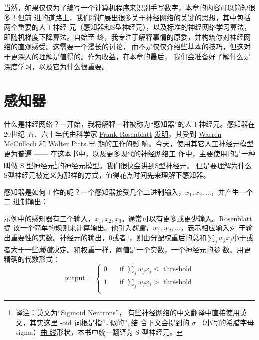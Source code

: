当然，如果仅仅为了编写一个计算机程序来识别手写数字，本章的内容可以简短很多！但前
进的道路上，我们将扩展出很多关于神经网络的关键的思想，其中包括两个重要的人工神经
元（感知器和S型神经元），以及标准的神经网络学习算法，即随机梯度下降算法。自始至
终，我专注于解释事情的原委，并构筑你对神经网络的直观感受。这需要一个漫长的讨论，
而不是仅仅介绍些基本的技巧，但这对于更深入的理解是值得的。作为收益，在本章的最后，
我们会准备好了解什么是深度学习，以及它为什么很重要。

\section{感知器}
\label{sec:Perceptrons}

什么是神经网络？一开始，我将解释一种被称为``感知器''的人工神经元。感知器在20世纪
五、六十年代由科学家 \href{http://en.wikipedia.org/wiki/Frank_Rosenblatt}{Frank
  Rosenblatt}
\href{http://books.google.ca/books/about/Principles_of_neurodynamics.html?id=7FhRAAAAMAAJ}{
  发明}，其受到 \href{http://en.wikipedia.org/wiki/Warren_McCulloch}{Warren
  McCulloch} 和 \href{http://en.wikipedia.org/wiki/Walter_Pitts}{Walter Pitts} 早
期的\href{http://scholar.google.ca/scholar?cluster=4035975255085082870}{工作}的影
响。今天，使用其它人工神经元模型更为普遍 —— 在这本书中，以及更多现代的神经网络工
作中，主要使用的是一种叫做 S 型神经元\footnote{译注：英文为``Sigmoid Neutrons''，
  有些神经网络的中文翻译中直接使用英文，其实这里 -oid 词根是指``\ldots 似的'', 结
  合下文会提到的 $\sigma$ （小写的希腊字母 sigma）\hyperref[fig:sigmoid_graph]{曲
    线}形状，本书中统一翻译为 S 型神经元。}的神经元模型。我们很快会讲到S型神经元。
但是要理解为什么S型神经元被定义为那样的方式，值得花点时间先来理解下感知器。

感知器是如何工作的呢？一个感知器接受几个二进制输入，$x_1,x_2,\ldots$，并产生一个二
进制输出：
\begin{center}
\end{center}

示例中的感知器有三个输入，$x_1,x_2,x_3$。通常可以有更多或更少输入。Rosenblatt 提
议一个简单的规则来计算输出。他引入\emph{权重}，$w_1,w_2,\ldots$，表示相应输入对
于输出重要性的实数。神经元的输出，$0$或者$1$，则由分配权重后的总和$\sum_j w_j
x_j$小于或者大于一些\emph{阈值}决定。和权重一样，阈值是一个实数，一个神经元的参
数。用更精确的代数形式：
\begin{equation}
  \text{output} = \begin{cases}
    0 & \quad \text{if } \sum_j w_j x_j \leq \text{ threshold} \\
    1 & \quad \text{if } \sum_j w_j x_j > \text{ threshold} \\
  \end{cases}
  \tag{1}
\end{equation}

